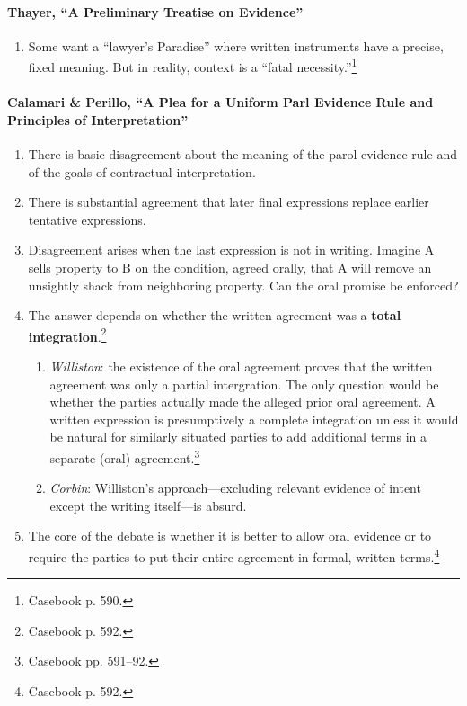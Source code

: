 \paragraph{Thayer, ``A Preliminary Treatise on Evidence''}

\begin{enumerate}
    \item Some want a ``lawyer's Paradise'' where written instruments have a 
    precise, fixed meaning. But in reality, context is a ``fatal 
    necessity.''\footnote{Casebook p. 590.}
\end{enumerate}

\paragraph{Calamari \& Perillo, ``A Plea for a Uniform Parl Evidence Rule and 
Principles of Interpretation''}

\begin{enumerate}
    \item There is basic disagreement about the meaning of the parol evidence 
    rule and of the goals of contractual interpretation.
    \item There is substantial agreement that later final expressions replace 
    earlier tentative expressions.
    \item Disagreement arises when the last expression is not in writing. 
    Imagine A sells property to B on the condition, agreed orally, that A will 
    remove an unsightly shack from neighboring property. Can the oral promise 
    be enforced?
    \item The answer depends on whether the written agreement was a 
    \textbf{total integration}.\footnote{Casebook p. 592.}
    \begin{enumerate}
        \item \emph{Williston}: the existence of the oral agreement proves 
        that the written agreement was only a partial intergration. The only 
        question would be whether the parties actually made the alleged prior 
        oral agreement. A written expression is presumptively a complete 
        integration unless it would be natural for similarly situated parties 
        to add additional terms in a separate (oral) 
        agreement.\footnote{Casebook pp. 591--92.}
        \item \emph{Corbin}: Williston's approach---excluding relevant 
        evidence of intent except the writing itself---is absurd.
    \end{enumerate}
    \item The core of the debate is whether it is better to allow oral 
    evidence or to require the parties to put their entire agreement in 
    formal, written terms.\footnote{Casebook p. 592.}
\end{enumerate}

